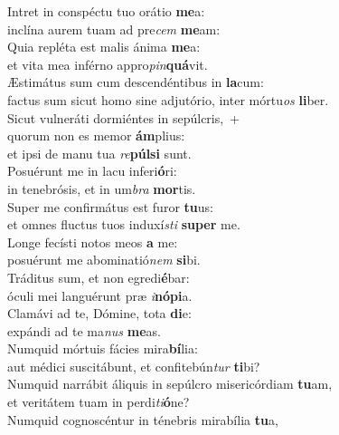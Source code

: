 \evenverse Intret in conspéctu tuo orátio \textbf{me}a:~\*\\
\evenverse inclína aurem tuam ad pre\textit{cem} \textbf{me}am:\\
\oddverse Quia repléta est malis ánima \textbf{me}a:~\*\\
\oddverse et vita mea inférno appro\textit{pin}\textbf{quá}vit.\\
\evenverse Æstimátus sum cum descendéntibus in \textbf{la}cum:~\*\\
\evenverse factus sum sicut homo sine adjutório, inter mórtu\textit{os} \textbf{li}ber.\\
\oddverse Sicut vulneráti dormiéntes in sepúlcris,~+\\
\oddverse  quorum non es memor \textbf{ám}plius:~\*\\
\oddverse et ipsi de manu tua \textit{re}\textbf{púl}\textbf{si} sunt.\\
\evenverse Posuérunt me in lacu inferi\textbf{ó}ri:~\*\\
\evenverse in tenebrósis, et in um\textit{bra} \textbf{mor}tis.\\
\oddverse Super me confirmátus est furor \textbf{tu}us:~\*\\
\oddverse et omnes fluctus tuos induxí\textit{sti} \textbf{su}\textbf{per} me.\\
\evenverse Longe fecísti notos meos \textbf{a} me:~\*\\
\evenverse posuérunt me abominatió\textit{nem} \textbf{si}bi.\\
\oddverse Tráditus sum, et non egredi\textbf{é}bar:~\*\\
\oddverse óculi mei languérunt præ \textit{i}\textbf{nó}\textbf{pi}a.\\
\evenverse Clamávi ad te, Dómine, tota \textbf{di}e:~\*\\
\evenverse expándi ad te ma\textit{nus} \textbf{me}as.\\
\oddverse Numquid mórtuis fácies mira\textbf{bí}lia:~\*\\
\oddverse aut médici suscitábunt, et confitebún\textit{tur} \textbf{ti}bi?\\
\evenverse Numquid narrábit áliquis in sepúlcro misericórdiam \textbf{tu}am,~\*\\
\evenverse et veritátem tuam in perdi\textit{ti}\textbf{ó}ne?\\
\oddverse Numquid cognoscéntur in ténebris mirabília \textbf{tu}a,~\*\\
